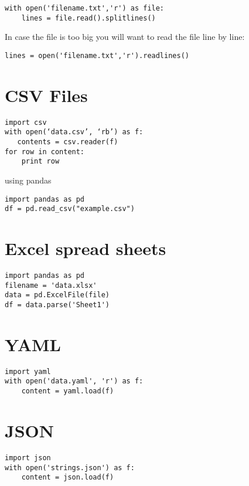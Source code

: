 \begin{verbatim}
with open('filename.txt','r') as file:
    lines = file.read().splitlines()
\end{verbatim}


In case the file is too big you will want to read the file line by
line:

\begin{verbatim}
lines = open('filename.txt','r').readlines()
\end{verbatim}


\section{CSV Files}

\begin{verbatim}
import csv
with open(‘data.csv’, ‘rb’) as f:
   contents = csv.reader(f)
for row in content:
    print row
\end{verbatim}

using pandas

\begin{verbatim}
import pandas as pd
df = pd.read_csv("example.csv") 
\end{verbatim}

\section{Excel spread sheets}

\begin{verbatim}
import pandas as pd
filename = 'data.xlsx'
data = pd.ExcelFile(file)
df = data.parse('Sheet1')
\end{verbatim}

\section{YAML}

\begin{verbatim}
import yaml
with open('data.yaml', 'r') as f:
    content = yaml.load(f)
\end{verbatim}

\section{JSON}

\begin{verbatim}
import json
with open('strings.json') as f:
    content = json.load(f)
\end{verbatim}

